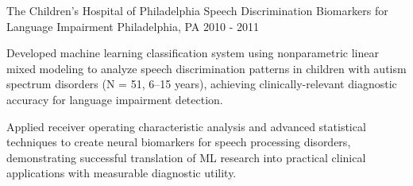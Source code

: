 \begin{cventries}
    \cventry
      {The Children's Hospital of Philadelphia} %
      {Speech Discrimination Biomarkers for Language Impairment} %
      {Philadelphia, PA} %
      {2010 - 2011} %
      {
        \begin{cvitems} %
          \item {Developed machine learning classification system using nonparametric linear mixed modeling to analyze speech discrimination patterns in children with autism spectrum disorders (N = 51, 6–15 years), achieving clinically-relevant diagnostic accuracy for language impairment detection.}
          \item {Applied receiver operating characteristic analysis and advanced statistical techniques to create neural biomarkers for speech processing disorders, demonstrating successful translation of ML research into practical clinical applications with measurable diagnostic utility.}
        \end{cvitems}
      }

  \end{cventries}
